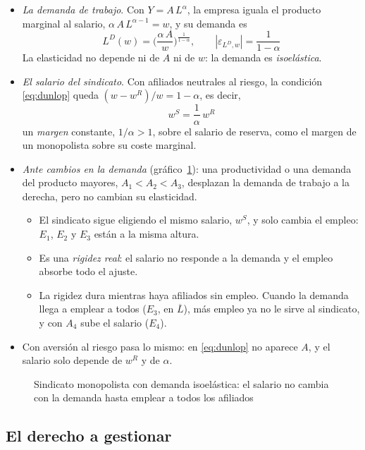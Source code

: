 \documentclass[11pt]{article}
\begin{document}
\begin{itemize}
\item \emph{La demanda de trabajo}. Con $Y=A\,L^{\alpha}$, la empresa iguala el producto marginal al salario, $\alpha\,A\,L^{\alpha-1}=w$, y su demanda es
  $$L^D(w)=\Big(\frac{\alpha\,A}{w}\Big)^{\frac{1}{1-\alpha}},\qquad |\varepsilon_{L^D,w}|=\frac{1}{1-\alpha}$$
  La elasticidad no depende ni de $A$ ni de $w$: la demanda es \emph{isoelástica}.
\item \emph{El salario del sindicato}. Con afiliados neutrales al riesgo, la condición \eqref{eq:dunlop} queda $(w-w^R)/w=1-\alpha$, es decir,
  $$w^S=\frac{1}{\alpha}\,w^R$$
  un \emph{margen} constante, $1/\alpha>1$, sobre el salario de reserva, como el margen de un monopolista sobre su coste marginal.
\item \emph{Ante cambios en la demanda} (gráfico~\ref{fig:sindicato-monopolista-rigidez}): una productividad o una demanda del producto mayores, $A_1<A_2<A_3$, desplazan la demanda de trabajo a la derecha, pero no cambian su elasticidad.
  \begin{itemize}
  \item El sindicato sigue eligiendo el mismo salario, $w^S$, y solo cambia el empleo: $E_1$, $E_2$ y $E_3$ están a la misma altura.
  \item Es una \emph{rigidez real}: el salario no responde a la demanda y el empleo absorbe todo el ajuste.
  \item La rigidez dura mientras haya afiliados sin empleo. Cuando la demanda llega a emplear a todos ($E_3$, en $\overline{L}$), más empleo ya no le sirve al sindicato, y con $A_4$ sube el salario ($E_4$).
  \end{itemize}
\item Con aversión al riesgo pasa lo mismo: en \eqref{eq:dunlop} no aparece $A$, y el salario solo depende de $w^R$ y de $\alpha$.
\end{itemize}
\begin{figure}[H]
\centering
\caption{Sindicato monopolista con demanda isoelástica: el salario no cambia con la demanda hasta emplear a todos los afiliados}\label{fig:sindicato-monopolista-rigidez}
\end{figure}

\subsection{El derecho a gestionar}\label{anexo:derecho-gestionar}
\end{document}
